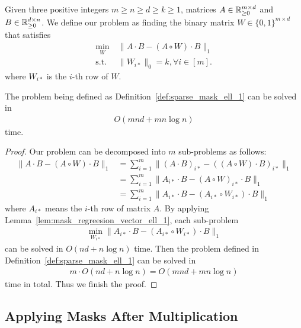 \begin{definition}\label{def:sparse_mask_ell_1}
Given three positive integers $m \geq n \geq d \geq k \geq 1$, matrices $A \in \mathbb{R}_{\geq 0}^{m \times d}$ and $B \in \mathbb{R}_{\geq 0}^{d\times n}$. We define our  problem as finding the binary matrix $W\in \{0, 1\}^{m \times d}$ that satisfies 
\begin{align*}
     \min_{W} & ~ \| A \cdot B - (A \circ W) \cdot B \|_1 \\
    \mathrm{s.t.} & ~ \| W_{i*} \|_0 = k , \forall i \in [m].
\end{align*}
where $W_{i*}$ is the $i$-th row of $W$.
\end{definition}

\begin{theorem}\label{thm:mask_regression}
The problem being defined as Definition~\ref{def:sparse_mask_ell_1} can be solved in
\begin{align*}
    O(mnd + mn\log n)
\end{align*}
time.
\end{theorem}

\begin{proof}
Our problem can be decomposed into $m$ sub-problems as follows:
\begin{align*}
    \| A\cdot B - (A\circ W) \cdot B \|_1 & =  \sum_{i=1}^m \big\|(A\cdot B)_{i*} - ((A\circ W) \cdot B)_{i*}  \big\|_1 \\
    & = \sum_{i=1}^m\big\|A_{i*}\cdot B - (A\circ W)_{i*} \cdot B \big\|_1 \\
    & = \sum_{i=1}^m\big\|A_{i*}\cdot B - (A_{i*}\circ W_{i*}) \cdot B  \big\|_1
\end{align*}
where $A_{i*}$ means the $i$-th row of matrix $A$. By applying Lemma~\ref{lem:mask_regreesion_vector_ell_1}, each sub-problem
\begin{align*}
    \min_{W_{i*}} \| A_{i*}\cdot B - (A_{i*}\circ W_{i*}) \cdot B \|_1
\end{align*}
can be solved in $O(nd + n\log n)$ time. Then the problem defined in Definition~\ref{def:sparse_mask_ell_1} can be solved in
\begin{align*}
    m \cdot O(nd + n\log n) = O(mnd + mn\log n)
\end{align*}
time in total. Thus we finish the proof.
\end{proof}


\subsection{Applying Masks After Multiplication}

